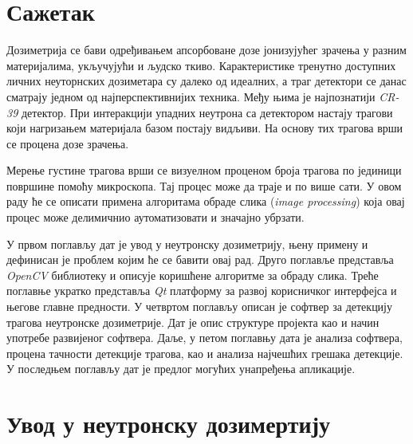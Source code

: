 \documentclass[11pt,a4paper,serbian,oneside]{book}
\begin{document}


%
%
%

\tableofcontents
\newpage

%
%
%

\chapter*{Сажетак}

Дозиметрија се бави одређивањем апсорбоване дозе јонизујућег зрачења у разним ма\-те\-ри\-ја\-ли\-ма, укључујући и људско ткиво. Карактеристике тренутно доступних личних неуторнских дозиметара су далеко од идеалних, а траг детектори се данас сматрају једном од најперспективнијих техника. Међу њима је најпознатији \textit{CR-39} детектор. При ин\-те\-рак\-ци\-ји упадних неутрона са детектором настају трагови који нагризањем материјала базом постају видљиви. На основу тих трагова врши се процена дозе зрачења. 

Мерење густине трагова врши се визуелном проценом броја трагова по јединици по\-вр\-ши\-не помоћу микроскопа. Тај процес може да траје и по више сати. У овом раду ће се описати примена алгоритама обраде слика (\textit{image processing}) која овај процес може делимичнио аутоматизовати и значајно убрзати.

У првом поглављу дат је увод у неутронску дозиметрију, њену примену и дефинисан је проблем којим ће се бавити овај рад. Друго поглавље представља \textit{OpenCV} библиотеку и описује коришћене алгоритме за обраду слика. Треће поглавње укратко представља \textit{Qt} платформу за развој корисничког интерфејса и његове главне предности. У четвртом поглављу описан је софтвер за детекцију трагова неутронске дозиметрије. Дат је опис структуре пројекта као и начин употребе развијеног софтвера. Даље, у петом поглавњу дата је анализа софтвера, процена тачности детекције трагова, као и анализа најчешћих грешака детекције. У последњем поглављу дат је предлог могућих унапређења апликације.

%
%
%

\chapter{Увод у неутронску дозимертију}
\end{document}
